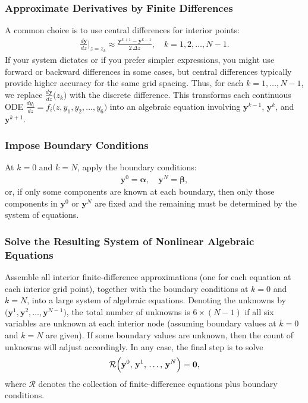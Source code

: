 \documentclass[a4paper,fleqn]{cas-sc}
\begin{document}
    \subsubsection*{Approximate Derivatives by Finite Differences}
    A common choice is to use central differences for interior points:
    \begin{align}
        \frac{d \mathbf{y}}{dz}\biggr\rvert_{z=z_k}
        \approx
        \frac{\mathbf{y}^{k+1} - \mathbf{y}^{k-1}}{2\,\Delta z},
        \quad
        k = 1, 2, \ldots, N-1.
    \end{align}
    If your system dictates or if you prefer simpler expressions, you might use forward or backward differences in some cases, but central differences typically provide higher accuracy for the same grid spacing. Thus, for each $k=1,\dots,N-1$, we replace \(\frac{d \mathbf{y}}{dz}\bigl(z_k\bigr)\) with the discrete difference. This transforms each continuous ODE \(\frac{d y_i}{dz} = f_i\bigl(z, y_1, y_2, \ldots, y_6\bigr)\) into an algebraic equation involving $\mathbf{y}^{k-1}$, $\mathbf{y}^k$, and $\mathbf{y}^{k+1}$.

    \subsubsection*{Impose Boundary Conditions}
    At $k=0$ and $k=N$, apply the boundary conditions:
    \begin{align}
        \mathbf{y}^0 = \boldsymbol{\alpha},
        \quad
        \mathbf{y}^N = \boldsymbol{\beta},
    \end{align}
    or, if only some components are known at each boundary, then only those components in $\mathbf{y}^0$ or $\mathbf{y}^N$ are fixed and the remaining must be determined by the system of equations.

    \subsubsection*{Solve the Resulting System of Nonlinear Algebraic Equations}
    Assemble all interior finite-difference approximations (one for each equation at each interior grid point), together with the boundary conditions at $k=0$ and $k=N$, into a large system of algebraic equations. Denoting the unknowns by \(\bigl(\mathbf{y}^1, \mathbf{y}^2, \dots, \mathbf{y}^{N-1}\bigr)\), the total number of unknowns is $6 \times (N-1)$ if all six variables are unknown at each interior node (assuming boundary values at $k=0$ and $k=N$ are given). If some boundary values are unknown, then the count of unknowns will adjust accordingly. In any case, the final step is to solve
    \begin{align}
        \mathcal{R}\Bigl(\mathbf{y}^0,\, \mathbf{y}^1,\, \dots,\, \mathbf{y}^N\Bigr)
        = \mathbf{0},
    \end{align}
    where $\mathcal{R}$ denotes the collection of finite-difference equations plus boundary conditions.
\end{document}
